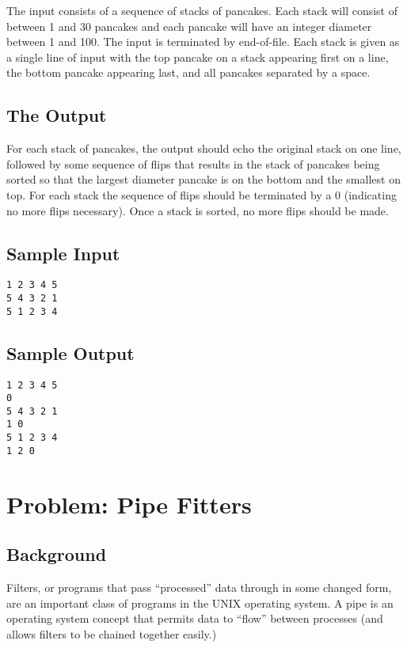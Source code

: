 The input consists of a sequence of stacks of pancakes.  Each stack will
consist of between 1 and 30 pancakes and each pancake will have an
integer diameter between 1 and 100.  The input is terminated by
end-of-file.  Each stack is given as a single line of input with the top
pancake on a stack appearing first on a line, the bottom pancake
appearing last, and all pancakes separated by a space.


\subsection*{The Output}
For each stack of pancakes, the output should echo the original stack on
one line, followed by some sequence of flips that results in the stack
of pancakes being sorted so that the largest diameter pancake is on the
bottom and the smallest on top.  For each stack the sequence of flips
should be terminated by a 0 (indicating no more flips necessary).  Once
a stack is sorted, no more flips should be made.

\subsection*{Sample Input}
\begin{verbatim}
1 2 3 4 5
5 4 3 2 1
5 1 2 3 4
\end{verbatim}


\subsection*{Sample Output}
\begin{verbatim}
1 2 3 4 5
0
5 4 3 2 1
1 0
5 1 2 3 4
1 2 0
\end{verbatim}

\clearpage

\section{Problem: Pipe Fitters}

\subsection*{Background}

Filters, or programs that pass ``processed'' data through in some
changed form, are an important class of programs in the UNIX operating
system.  A pipe is an operating system concept that permits data to
``flow'' between processes (and allows filters to be chained together
easily.)  

